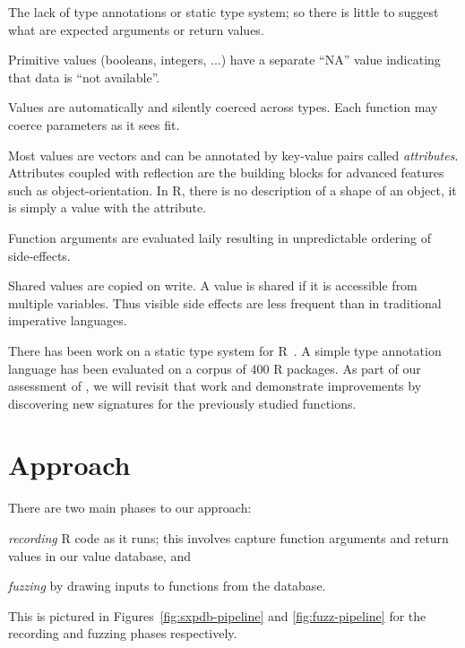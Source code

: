 \documentclass[sigplan,nonacm,anonymous,review]{acmart}
\begin{document}
\begin{compactitem}[$-$]
\item The lack of type annotations or static type system; so there is
  little to suggest what are expected arguments or return values.
\item Primitive values (booleans, integers, ...)  have a separate
  ``NA'' value indicating that data is ``not available''.
\item Values are automatically and silently coerced across types.
  Each function may coerce parameters as it sees fit.
\item Most values are vectors and can be annotated by key-value pairs
  called \textit{attributes}.  Attributes coupled with reflection are
  the building blocks for advanced features such as
  object-orientation.  In R, there is no description of a shape of an
  object, it is simply a value with the  attribute.
\item Function arguments are evaluated laily resulting in unpredictable
  ordering of side-effects.
\item Shared values are copied on write. A value is shared if it is
  accessible from multiple variables. Thus visible side effects are less
  frequent than in traditional imperative languages.
\end{compactitem}


There has been work on a static type system for
R~\cite{turcotte2020designing}.  A simple type annotation language has
been evaluated on a corpus of 400 R packages.  As part of our
assessment of \tool, we will revisit that work and demonstrate improvements
by discovering new signatures for the previously studied functions.

\section{Approach}

There are two main phases to our approach:
%
\begin{inparaenum}[(1)]
\item \emph{recording} R code as it runs; this involves capture
  function arguments and return values in our value database, and
\item \emph{fuzzing} by drawing inputs to functions from the database.
\end{inparaenum}
This is pictured in Figures~\ref{fig:sxpdb-pipeline} and
\ref{fig:fuzz-pipeline} for the recording and fuzzing phases
respectively.
\end{document}
